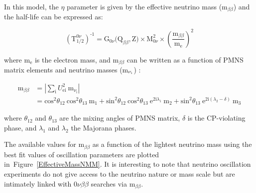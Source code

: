 \documentclass[main.tex]{subfiles}
\begin{document}
\NI In this model, the $\eta$ parameter is given by the effective neutrino mass (m$_{\beta\beta}$) and the half-life can be expressed as: 


\begin{equation}
(\text{T}_{\text{1/2}}^{\text{0}\nu})^{\text{-1}} = \text{G}_{\text{0}\nu}\text{(Q}_{\beta\beta},\text{Z)} \times \text{M}^\text{2}_{\text{0}\nu} \times \left( \frac{\text{m}_{\beta\beta}}{\text{m}_\text{e}} \right)^\text{2}
\end{equation}


\bigskip


\NI where m$_\text{e}$ is the electron mass, and m$_{\beta\beta}$ can be written as a function of PMNS matrix elements and neutrino masses (m$_{\nu_\text{\i}}$) : 


\begin{equation}
\begin{split}
\text{m}_{\beta\beta} & = |\sum_\text{i}U_{\text{ei}}^\text{2}~\text{m}_{\nu_\text{i}} | \\
 & = \text{cos}^\text{2}\theta_{\text{12}}~\text{cos}^\text{2}\theta_{\text{13}}~\text{m}_\text{1} + \text{sin}^\text{2}\theta_{\text{12}}~\text{cos}^\text{2}\theta_{\text{13}}~\text{e}^{\text{2i}\lambda_\text{1}} ~\text{m}_\text{2} + \text{sin}^\text{2}\theta_{\text{13}}~\text{e}^{\text{2i}(\lambda_\text{2}-\delta)}~\text{m}_\text{3}
\end{split}
\end{equation}


\bigskip


\NI where $\theta_{\text{12}}$ and $\theta_{\text{13}}$ are the mixing angles of PMNS matrix, $\delta$ is the CP-violating phase, and $\lambda_\text{1}$ and $\lambda_\text{2}$ the Majorana phases.  


\bigskip


\NI The available values for m$_{\beta\beta}$ as a function of the lightest neutrino mass using the best fit values of oscillation parameters are plotted in~Figure~\ref{EffectiveMassNMM}. It is interesting to note that neutrino oscillation experiments do not give access to the neutrino nature or mass scale but are intimately linked with 0$\nu\beta\beta$ searches via m$_{\beta\beta}$. 
\end{document}
